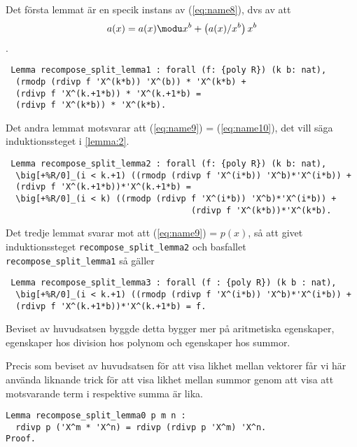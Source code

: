 Det första lemmat är en specik instans av (\ref{eq:name8}), dvs av att 
\begin{align*}
 a(x)= a(x)  \modu x^b + \left(a(x)/x^b\right) x^b 
\end{align*}.
\begin{verbatim}
 Lemma recompose_split_lemma1 : forall (f: {poly R}) (k b: nat),
  (rmodp (rdivp f 'X^(k*b)) 'X^(b)) * 'X^(k*b) + 
  (rdivp f 'X^(k.+1*b)) * 'X^(k.+1*b) = 
  (rdivp f 'X^(k*b)) * 'X^(k*b).
\end{verbatim}
Det andra lemmat motsvarar att (\ref{eq:name9}) = (\ref{eq:name10}), det vill säga induktionssteget
i \ref{lemma:2}.
\begin{verbatim}
 Lemma recompose_split_lemma2 : forall (f: {poly R}) (k b: nat),
  \big[+%R/0]_(i < k.+1) ((rmodp (rdivp f 'X^(i*b)) 'X^b)*'X^(i*b)) + 
  (rdivp f 'X^(k.+1*b))*'X^(k.+1*b) =
  \big[+%R/0]_(i < k) ((rmodp (rdivp f 'X^(i*b)) 'X^b)*'X^(i*b)) +
                                     (rdivp f 'X^(k*b))*'X^(k*b).
\end{verbatim}

Det tredje lemmat svarar mot att (\ref{eq:name9}) = $p(x)$, så att givet induktionssteget 
\verb=recompose_split_lemma2= och basfallet \verb=recompose_split_lemma1= så gäller
\begin{verbatim}
 Lemma recompose_split_lemma3 : forall (f : {poly R}) (k b : nat),
  \big[+%R/0]_(i < k.+1) ((rmodp (rdivp f 'X^(i*b)) 'X^b)*'X^(i*b)) +
  (rdivp f 'X^(k.+1*b))*'X^(k.+1*b) = f.
\end{verbatim}
Beviset av huvudsatsen byggde detta bygger mer på aritmetiska egenskaper, egenskaper
hos division hos polynom och egenskaper hos summor.

Precis som beviset av huvudsatsen för att visa likhet mellan vektorer får vi här
använda liknande trick för att visa likhet mellan summor genom att visa att motsvarande
term i respektive summa är lika.

\begin{verbatim}
Lemma recompose_split_lemma0 p m n :
  rdivp p ('X^m * 'X^n) = rdivp (rdivp p 'X^m) 'X^n.
Proof.
\end{verbatim}
